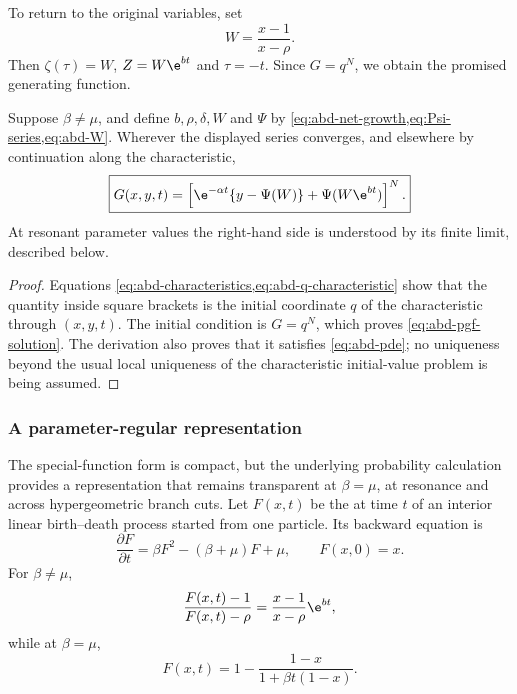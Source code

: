 To return to the original variables, set
\begin{equation}
  W=\frac{x-1}{x-\rho}.
  \label{eq:abd-W}
\end{equation}
Then \(\zeta(\tau)=W\), \(Z=W\e^{bt}\) and \(\tau=-t\).  Since
\(G=q^N\), we obtain the promised generating function.

\begin{proposition}
\label{prop:abd-pgf}
Suppose \(\beta\neq\mu\), and define \(b,\rho,\delta,W\) and \(\Psi\) by
\cref{eq:abd-net-growth,eq:Psi-series,eq:abd-W}.  Wherever the displayed series
converges, and elsewhere by continuation along the characteristic,
\begin{equation}
  \boxed{
  G(x,y,t)=
  \left[
    \e^{-\alpha t}\{y-\Psi(W)\}
    +\Psi(W\e^{bt})
  \right]^N.}
  \label{eq:abd-pgf-solution}
\end{equation}
At resonant parameter values the right-hand side is understood by its finite
limit, described below.
\end{proposition}

\begin{proof}
Equations \cref{eq:abd-characteristics,eq:abd-q-characteristic} show that the
quantity inside square brackets is the initial coordinate \(q\) of the
characteristic through \((x,y,t)\).  The initial condition is \(G=q^N\), which
proves \cref{eq:abd-pgf-solution}.  The derivation also proves that it satisfies
\cref{eq:abd-pde}; no uniqueness beyond the usual local uniqueness of the
characteristic initial-value problem is being assumed.
\end{proof}

\subsubsection{A parameter-regular representation}
\label{sec:abd-regular}

The special-function form is compact, but the underlying probability calculation
provides a representation that remains transparent at \(\beta=\mu\), at resonance
and across hypergeometric branch cuts.  Let \(F(x,t)\) be the \pgf{} at time \(t\)
of an interior linear birth--death process started from one particle.  Its backward
equation is
\begin{equation}
  \frac{\partial F}{\partial t}
  =\beta F^2-(\beta+\mu)F+\mu,
  \qquad F(x,0)=x.
  \label{eq:interior-bd-backward}
\end{equation}
For \(\beta\neq\mu\),
\begin{equation}
  \frac{F(x,t)-1}{F(x,t)-\rho}
  =\frac{x-1}{x-\rho}\e^{bt},
  \label{eq:interior-bd-ratio}
\end{equation}
while at \(\beta=\mu\),
\begin{equation}
  F(x,t)
  =1-\frac{1-x}{1+\beta t(1-x)}.
  \label{eq:interior-bd-critical}
\end{equation}


